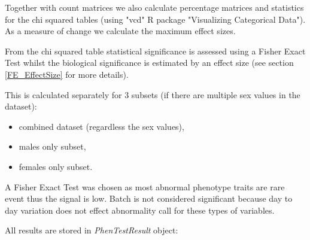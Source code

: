 \documentclass[12pt,a4paper]{article}
\begin{document}
Together with count matrices we also calculate percentage matrices and statistics for the chi squared tables (using "vcd" R package "Visualizing Categorical Data").  As a measure of change we calculate the maximum effect sizes. 

From the chi squared table statistical significance is assessed using a Fisher Exact Test whilst the biological significance is estimated by an effect size (see section \ref{FE_EffectSize} for more details).

This is calculated separately for 3 subsets (if there are multiple sex values in the dataset):
\begin{itemize}
 \item combined dataset (regardless the sex values),
 \item males only subset,
 \item females only subset.
\end{itemize}

A Fisher Exact Test was chosen as most abnormal phenotype traits are rare event thus the signal is low. Batch is not considered significant because day to day variation does not effect abnormality call for these types of variables.

All results are stored in \textit{PhenTestResult} object:
\end{document}
